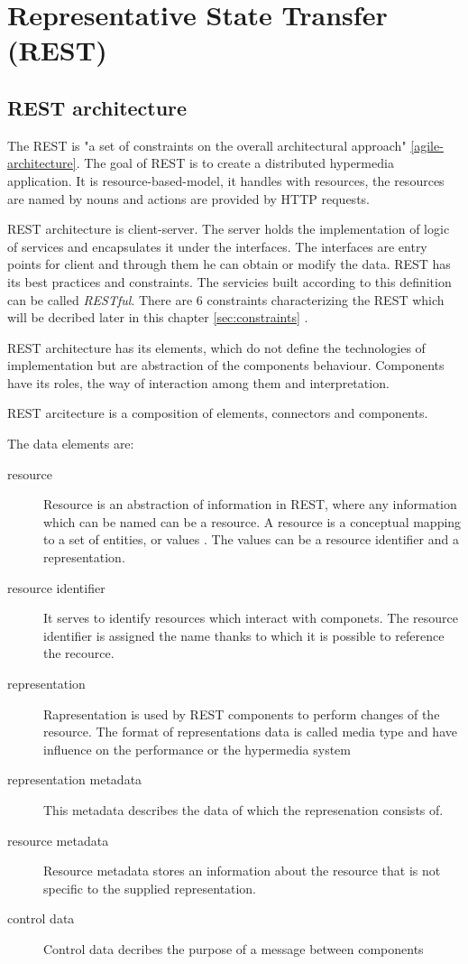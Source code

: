 \chapter{Representative State Transfer (REST)}
\label{chap:rest}

\section{REST architecture}
\label{sec:rest-architecture}

The REST is "a set of constraints on the overall architectural approach" \ref{agile-architecture}. The goal of REST is to create a distributed hypermedia application. It is \gls{resource-based-model}, it handles with resources, the resources are named by nouns and actions are provided by HTTP requests. 

REST architecture is client-server. The server holds the implementation of logic of services and encapsulates it under the interfaces. The interfaces are entry points for client and through them he can obtain or modify the data.
REST has its best practices and constraints. The servicies built according to this definition can be called \emph{RESTful}. There are 6 constraints characterizing the REST which will be decribed later in this chapter \ref{sec:constraints} .

REST architecture has its elements, which do not define the technologies of implementation but are abstraction of the components behaviour. Components have its roles, the way of interaction among them and interpretation.

REST arcitecture is a composition of elements, connectors and components.

The data elements are:

\begin{description}
  \item [resource] 
  Resource is an abstraction of information in REST, where any information which can be named can be a resource. A resource is a conceptual mapping to a set of entities, or values \cite{fielding}. The values can be a resource identifier and a representation.
  \item [resource identifier] 
  It serves to identify resources which interact with componets. The resource identifier is assigned the name thanks to which it is possible to reference the recource.
  \item [representation] 
  Rapresentation is used by REST components to perform changes of the resource. The format of representations data is called media type and have influence on the performance or the hypermedia system  
  \item [representation metadata] 
  This metadata describes the data of which the represenation consists of.
   \item [resource metadata] 
  Resource metadata stores an information about the resource that is not specific to the supplied representation.
  \item [control data]
  Control data decribes the purpose of a message between components
\end{description}

